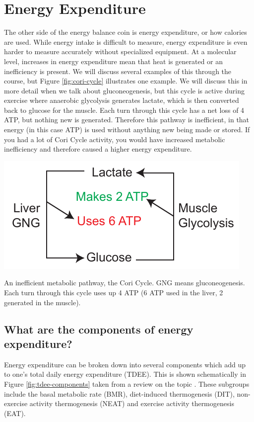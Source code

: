 \documentclass{tufte-handout}
\begin{document}
\section{Energy Expenditure}

The other side of the energy balance coin is energy expenditure, or how calories are used.  While energy intake is difficult to measure, energy expenditure is even harder to measure accurately without specialized equipment.  At a molecular level, increases in energy expenditure mean that heat is generated or an inefficiency is present.  We will discuss several examples of this through the course, but Figure \ref{fig:cori-cycle} illustrates one example.  We will discuss this in more detail when we talk about gluconeogenesis, but this cycle is active during exercise where anaerobic glycolysis generates lactate, which is then converted back to glucose for the muscle.  Each turn through this cycle has a net loss of 4 ATP, but nothing new is generated.  Therefore this pathway is inefficient, in that energy (in this case ATP) is used without anything new being made or stored.  If you had a lot of Cori Cycle activity, you would have increased metabolic inefficiency and therefore caused a higher energy expenditure.

\begin{marginfigure}
\includegraphics{figures/cori-cycle.pdf}\
\caption{An inefficient metabolic pathway, the Cori Cycle.  GNG means gluconeogenesis.  Each turn through this cycle uses up 4 ATP (6 ATP used in the liver, 2 generated in the muscle).}
\label{fig:cori-cycle}
\end{marginfigure}


\subsection{What are the components of energy expenditure?}
Energy expenditure can be broken down into several components which add up to one's total daily energy expenditure (TDEE).  This is shown schematically in Figure \ref{fig:tdee-components} taken from a review on the topic \citep{Tam2015}.  These subgroups include the basal metabolic rate (BMR), diet-induced thermogenesis (DIT), non-exercise activity thermogenesis (NEAT) and exercise activity thermogenesis (EAT).  
\end{document}

